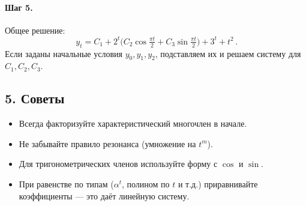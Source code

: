 \paragraph{Шаг 5.} Общее решение:
\[
\boxed{\,y_t=C_1 + 2^{t}\bigl(C_2\cos\tfrac{\pi t}{2}+C_3\sin\tfrac{\pi t}{2}\bigr) + 3^{t} + t^{2}\, }.
\]
Если заданы начальные условия \(y_0,y_1,y_2\), подставляем их и решаем систему для \(C_1,C_2,C_3\).

\subsection*{5. Советы}
\begin{itemize}
  \item Всегда факторизуйте характеристический многочлен в начале.
  \item Не забывайте правило резонанса (умножение на \(t^{m}\)).
  \item Для тригонометрических членов используйте форму с \(\cos\) и \(\sin\).
  \item При равенстве по типам (\(\alpha^{t}\), полином по \(t\) и т.д.) приравнивайте коэффициенты — это даёт линейную систему.
\end{itemize}
